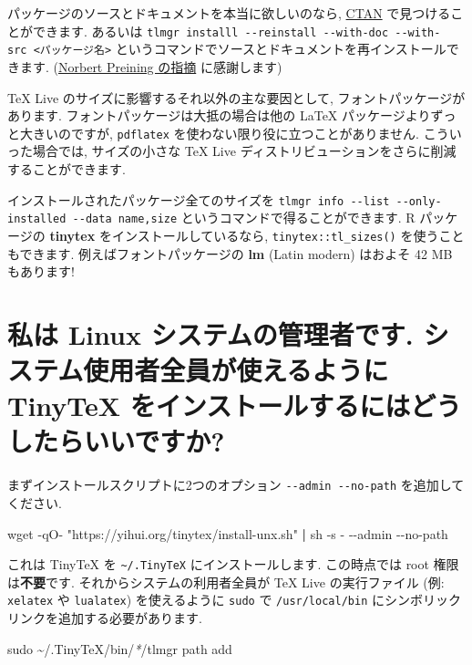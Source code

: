 \documentclass[
  xelatex,ja=standard,jafont=noto]{bxjsreport}
\newenvironment{Shaded}{\begin{snugshade}}{\end{snugshade}}
\newcommand{\AttributeTok}[1]{\textcolor[rgb]{0.77,0.63,0.00}{#1}}
\newcommand{\FunctionTok}[1]{\textcolor[rgb]{0.00,0.00,0.00}{#1}}
\newcommand{\KeywordTok}[1]{\textcolor[rgb]{0.13,0.29,0.53}{\textbf{#1}}}
\newcommand{\NormalTok}[1]{#1}
\newcommand{\PreprocessorTok}[1]{\textcolor[rgb]{0.56,0.35,0.01}{\textit{#1}}}
\newcommand{\StringTok}[1]{\textcolor[rgb]{0.31,0.60,0.02}{#1}}
\begin{document}
パッケージのソースとドキュメントを本当に欲しいのなら,
\href{https://ctan.org}{CTAN} で見つけることができます. あるいは
\texttt{tlmgr\ installl\ -\/-reinstall\ -\/-with-doc\ -\/-with-src\ \textless{}パッケージ名\textgreater{}}
というコマンドでソースとドキュメントを再インストールできます.
(\href{https://github.com/yihui/tinytex/pull/236\#issuecomment-690789472}{Norbert
Preining の指摘} に感謝します)

TeX Live のサイズに影響するそれ以外の主な要因として,
フォントパッケージがあります. フォントパッケージは大抵の場合は他の LaTeX
パッケージよりずっと大きいのですが, \texttt{pdflatex}
を使わない限り役に立つことがありません. こういった場合では,
サイズの小さな TeX Live
ディストリビューションをさらに削減することができます.

インストールされたパッケージ全てのサイズを
\texttt{tlmgr\ info\ -\/-list\ -\/-only-installed\ -\/-data\ name,size}
というコマンドで得ることができます. R パッケージの \textbf{tinytex}
をインストールしているなら, \texttt{tinytex::tl\_sizes()}
を使うこともできます. 例えばフォントパッケージの \textbf{lm} (Latin
modern) はおよそ 42 MB もあります!

\hypertarget{sys-install}{%
\section{私は Linux システムの管理者です.
システム使用者全員が使えるように TinyTeX
をインストールするにはどうしたらいいですか?}\label{sys-install}}

まずインストールスクリプトに2つのオプション
\texttt{-\/-admin\ -\/-no-path} を追加してください.

\begin{Shaded}
\begin{Highlighting}[]
\FunctionTok{wget} \AttributeTok{{-}qO{-}} \StringTok{"https://yihui.org/tinytex/install{-}unx.sh"} \KeywordTok{|} \FunctionTok{sh} \AttributeTok{{-}s} \AttributeTok{{-}} \AttributeTok{{-}{-}admin} \AttributeTok{{-}{-}no{-}path}
\end{Highlighting}
\end{Shaded}

これは TinyTeX を \texttt{\textasciitilde{}/.TinyTeX}
にインストールします. この時点では root 権限は\textbf{不要}です.
それからシステムの利用者全員が TeX Live の実行ファイル (例:
\texttt{xelatex} や \texttt{lualatex}) を使えるように \texttt{sudo} で
\texttt{/usr/local/bin} にシンボリックリンクを追加する必要があります.

\begin{Shaded}
\begin{Highlighting}[]
\FunctionTok{sudo}\NormalTok{ \textasciitilde{}/.TinyTeX/bin/}\PreprocessorTok{*}\NormalTok{/tlmgr path add}
\end{Highlighting}
\end{Shaded}
\end{document}
